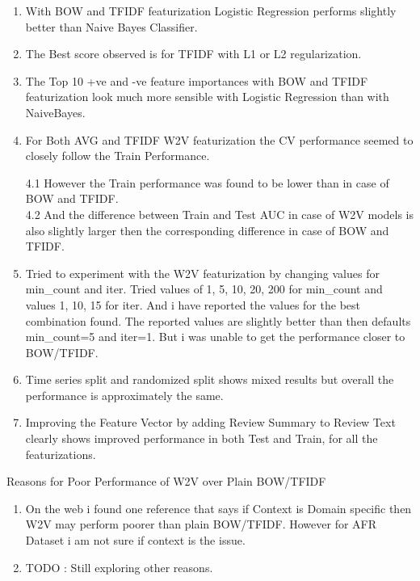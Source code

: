 \documentclass[11pt]{article}
\providecommand{\tightlist}{%
      \setlength{\itemsep}{0pt}\setlength{\parskip}{0pt}}
\begin{document}
    \begin{enumerate}
\def\labelenumi{\arabic{enumi}.}
\item
  With BOW and TFIDF featurization Logistic Regression performs slightly
  better than Naive Bayes Classifier.
\item
  The Best score observed is for TFIDF with L1 or L2 regularization.
\item
  The Top 10 +ve and -ve feature importances with BOW and TFIDF
  featurization look much more sensible with Logistic Regression than
  with NaiveBayes.
\item
  For Both AVG and TFIDF W2V featurization the CV performance seemed to
  closely follow the Train Performance.

  4.1 However the Train performance was found to be lower than in case
  of BOW and TFIDF.\\
  4.2 And the difference between Train and Test AUC in case of W2V
  models is also slightly larger then the corresponding difference in
  case of BOW and TFIDF.
\item
  Tried to experiment with the W2V featurization by changing values for
  min\_count and iter. Tried values of 1, 5, 10, 20, 200 for min\_count
  and values 1, 10, 15 for iter. And i have reported the values for the
  best combination found. The reported values are slightly better than
  then defaults min\_count=5 and iter=1. But i was unable to get the
  performance closer to BOW/TFIDF.
\item
  Time series split and randomized split shows mixed results but overall
  the performance is approximately the same.
\item
  Improving the Feature Vector by adding Review Summary to Review Text
  clearly shows improved performance in both Test and Train, for all the
  featurizations.
\end{enumerate}

    Reasons for Poor Performance of W2V over Plain BOW/TFIDF

\begin{enumerate}
\def\labelenumi{\arabic{enumi}.}
\tightlist
\item
  On the web i found one reference that says if Context is Domain
  specific then W2V may perform poorer than plain BOW/TFIDF. However for
  AFR Dataset i am not sure if context is the issue.
\item
  TODO : Still exploring other reasons.
\end{enumerate}


    
    
    
    
\end{document}
